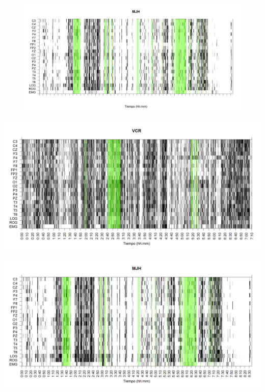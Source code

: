 \begin{figure}
\centering
\includegraphics[width=\linewidth]
{./complementario170409/MJNNVIGILOS_est.png} 
\label{grf:MJH}
\end{figure}


\begin{SidewaysFigure}
\centering
\includegraphics[width=\linewidth]
{./grafiquitos170404/VCNNS1_est.png} 
\caption{Sujeto: VCR | Total \'epocas: 2584 | \'Epocas MOR: 200
}
\label{VCR}
\end{SidewaysFigure}


\begin{SidewaysFigure}
\centering
\includegraphics[width=\linewidth]
{./grafiquitos170404/MJNNVIGILOS_est.png} 
\caption{Sujeto: MJH | Total \'epocas: 1032 | \'Epocas MOR: 127
}
\label{MJH}
\end{SidewaysFigure}

